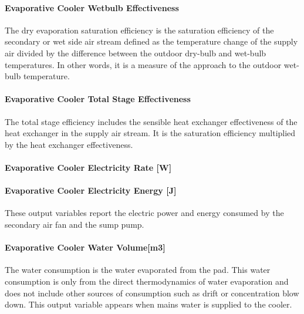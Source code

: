\paragraph{Evaporative Cooler Wetbulb Effectiveness}\label{evaporative-cooler-wetbulb-effectiveness}

The dry evaporation saturation efficiency is the saturation efficiency of the secondary or wet side air stream defined as the temperature change of the supply air divided by the difference between the outdoor dry-bulb and wet-bulb temperatures. In other words, it is a measure of the approach to the outdoor wet-bulb temperature.

\paragraph{Evaporative Cooler Total Stage Effectiveness}\label{evaporative-cooler-total-stage-effectiveness}

The total stage efficiency includes the sensible heat exchanger effectiveness of the heat exchanger in the supply air stream. It is the saturation efficiency multiplied by the heat exchanger effectiveness.

\paragraph{Evaporative Cooler Electricity Rate {[}W{]}}\label{evaporative-cooler-electric-powerw-2}

\paragraph{Evaporative Cooler Electricity Energy {[}J{]}}\label{evaporative-cooler-electric-energy-j-2}

These output variables report the electric power and energy consumed by the secondary air fan and the sump pump.

\paragraph{Evaporative Cooler Water Volume{[}m3{]}}\label{evaporative-cooler-water-volumem3}

The water consumption is the water evaporated from the pad. This water consumption is only from the direct thermodynamics of water evaporation and does not include other sources of consumption such as drift or concentration blow down. This output variable appears when mains water is supplied to the cooler.

